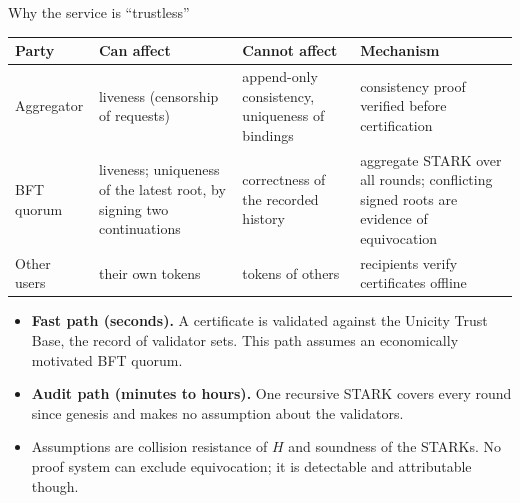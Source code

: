 \documentclass[aspectratio=169,10pt]{beamer}
\begin{document}
\begin{frame}{Why the service is ``trustless''}
\footnotesize
\begin{tabular}{@{}>{\raggedright}p{1.9cm} >{\raggedright}p{3.3cm} >{\raggedright}p{3.2cm} >{\raggedright\arraybackslash}p{4.3cm}@{}}
\toprule
Party & Can affect & Cannot affect & Mechanism \\
\midrule
Aggregator & liveness (censorship of requests) & append-only consistency, uniqueness of bindings & consistency proof verified before certification \\
\addlinespace
BFT quorum & liveness; uniqueness of the latest root, by signing two continuations & correctness of the recorded history & aggregate STARK over all rounds; conflicting signed roots are evidence of equivocation \\
\addlinespace
Other users & their own tokens & tokens of others & recipients verify certificates offline \\
\bottomrule
\end{tabular}

\vspace{3mm}
\small
\begin{itemize}
  \item \textbf{Fast path (seconds).} A certificate is validated against the Unicity Trust Base, the record of validator sets. This path assumes an economically motivated BFT quorum.
  \item \textbf{Audit path (minutes to hours).} One recursive STARK covers every round since genesis and makes no assumption about the validators.
  \item Assumptions are collision resistance of $H$ and soundness of the STARKs. No proof system can exclude equivocation; it is detectable and attributable though.
\end{itemize}
\end{frame}
\end{document}
